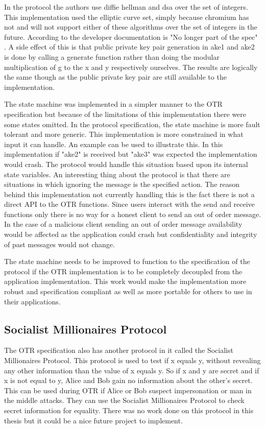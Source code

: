 In the protocol the authors use diffie hellman and dsa over the set of integers. This implementation used the elliptic curve set, simply because chromium has not and will not support either of these algorithms over the set of integers in the future. According to the developer documentation is "No longer part of the spec" \cite{webcrypto-chromium}. A side effect of this is that public private key pair generation in ake1 and ake2 is done by calling a generate function rather than doing the modular multiplication of g to the x and y respectively ourselves. The results are logically the same though as the public private key pair are still available to the implementation.  


The state machine was implemented in a simpler manner to the OTR specification but because of the limitations of this implementation there were some states omitted. In the protocol specification, the state machine is more fault tolerant and more generic. This implementation is more constrained in what input it can handle. An example can be used to illustrate this. In this implementation if "ake2" is received but "ake3" was expected the implementation would crash. The protocol would handle this situation based upon its internal state variables. An interesting thing about the protocol is that there are situations in which ignoring the message is the specified action. The reason behind this implementation not currently handling this is the fact there is not a direct API to the OTR functions. Since users interact with the send and receive functions only there is no way for a honest client to send an out of order message. In the case of a malicious client sending an out of order message availability would be affected as the application could crash but confidentiality and integrity of past messages would not change. 


The state machine needs to be improved to function to the specification of the protocol if the OTR implementation is to be completely decoupled from the application implementation. This work would make the implementation more robust and specification compliant as well as more portable for others to use in their applications.


\subsection{Socialist Millionaires Protocol}


The OTR specification also has another protocol in it called the Socialist Millionaires Protocol. This protocol is used to test if x equals y, without revealing any other information than the value of x equals y. So if x and y are secret and if x is not equal to y, Alice and Bob gain no information about the other's secret. This can be used during OTR if Alice or Bob suspect impersonation or man in the middle attacks. They can use the Socialist Millionaires Protocol to check secret information for equality. There was no work done on this protocol in this thesis but it could be a nice future project to implement.



